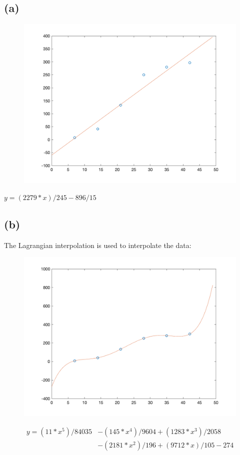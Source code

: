 \documentclass[12pt,a4paper]{article}
\begin{document}
\begin{spacing}{1.5}
\subsection{(a)}
\begin{figure}[htbp]
\centering
\includegraphics[scale=0.3]{figure/HW4_2_a.png}
\end{figure}

\begin{center}
$y = (2279*x)/245 - 896/15$
\end{center}


\newpage
\subsection{(b)}
\begin{center}
The Lagrangian interpolation is used to interpolate the data:
\end{center}
\begin{figure}[htbp]
\centering
\includegraphics[scale=.3]{figure/HW4_2_b.png}
\end{figure}
\[ \begin{split} 
y = (11*x^5)/84035 &- (145*x^4)/9604 + (1283*x^3)/2058 \\
					&- (2181*x^2)/196 + (9712*x)/105 - 274
\end{split} \]


\end{spacing}
\end{document}
